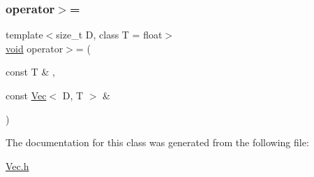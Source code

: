 \subsubsection{\texorpdfstring{operator$>$=}{operator>=}\hspace{0.1cm}{\footnotesize\ttfamily [2/2]}}
{\footnotesize\ttfamily template$<$size\+\_\+t D, class T = float$>$ \\
\hyperlink{namespacetrimesh_a784ddfd979e1c579bda795a8edfc3f43}{void} operator$>$= (\begin{DoxyParamCaption}\item[{const T \&}]{,  }\item[{const \hyperlink{classtrimesh_1_1Vec}{Vec}$<$ D, T $>$ \&}]{ }\end{DoxyParamCaption})\hspace{0.3cm}{\ttfamily [friend]}}



The documentation for this class was generated from the following file\+:\begin{DoxyCompactItemize}
\item 
\hyperlink{Vec_8h}{Vec.\+h}\end{DoxyCompactItemize}
